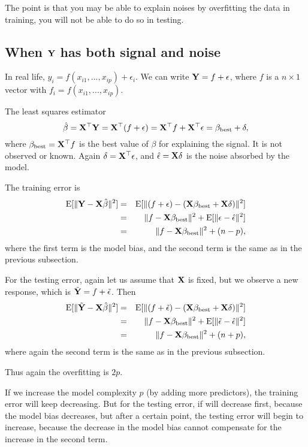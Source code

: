 \documentclass[11pt]{article}
\newcommand{\E}{\mathbb{E}}
\def\T{{\top}}
\def\E{{\rm E}}
\def\T{{\top}}
\def\X{{\bf X}}
\def\Y{{\bf Y}}
\begin{document}
The point is that you may be able to explain noises by overfitting the data in training, you will not be able to do so in testing. 

\subsection{When $\Y$ has both signal and noise} 

In real life, $y_i = f(x_{i1}, ..., x_{ip}) + \epsilon_i$. We can write $\Y = f + \epsilon$, where $f$ is a $n \times 1$ vector with $f_i = f(x_{i1}, ..., x_{ip})$. 

The least squares estimator 
\[
\hat{\beta} = \X^\T \Y = \X^\T (f + \epsilon) = \X^\T f + \X^\T \epsilon = \beta_{\rm best} + \delta, 
\]
where $\beta_{\rm best} = \X^\T f$ is the best value of $\beta$ for explaining the signal. It is not observed or known. Again $\delta = \X^\T \epsilon$, and $\hat{\epsilon} = \X\delta$ is the noise absorbed by the model. 

The training error is 
\begin{eqnarray*}
    \E[\|\Y - \X \hat{\beta}\|^2] &=& \E[\|(f + \epsilon) - (\X \beta_{\rm best} + \X \delta)\|^2]\\
    &=& \|f - \X\beta_{\rm best}\|^2 + \E[\|\epsilon - \hat{\epsilon}\|^2] \\
    &=&  \|f - \X\beta_{\rm best}\|^2 + (n-p), 
 \end{eqnarray*}
where the first term is the model bias, and  the second term is the same as in  the previous subsection. 

For the testing error, again let us assume that $\X$ is fixed, but we observe a new response, which is $\tilde{\Y} = f + \tilde{\epsilon}$. Then 
\begin{eqnarray*}
    \E[\|\tilde{\Y} - \X \hat{\beta}\|^2] &=& \E[\|(f + \tilde{\epsilon}) - (\X \beta_{\rm best} + \X \delta)\|^2]\\
    &=& \|f - \X\beta_{\rm best}\|^2 + \E[\|\tilde{\epsilon} - \hat{\epsilon}\|^2] \\
    &=&  \|f - \X\beta_{\rm best}\|^2 + (n+p), 
 \end{eqnarray*}
where again the second term is the same as in the previous subsection. 

Thus again the overfitting is $2p$. 

If we increase the model complexity $p$ (by adding more predictors), the training error will keep decreasing. But for the testing error, if will decrease first, because the model bias decreases, but after a certain point, the testing error will begin to increase, because the decrease in the model bias cannot compensate for the increase in the second term. 
\end{document}
